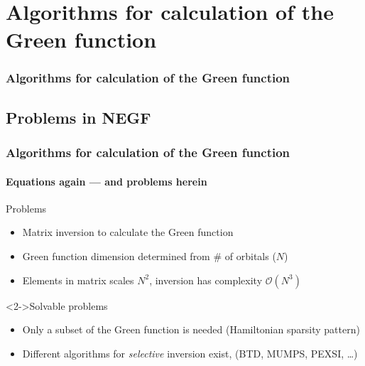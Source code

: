 \section{Algorithms for calculation of the Green function}

\begin{framenologo}
  \frametitle{Algorithms for calculation of the Green function}
  \tableofcontents[currentsection]
\end{framenologo}


\subsection{Problems in NEGF}

\begin{framenologo}
  \frametitle{Algorithms for calculation of the Green function}
  \framesubtitle{Equations again --- and problems herein}


  \begin{block}{Problems}
    \begin{itemize}
      \item Matrix inversion to calculate the Green function
      \item Green function dimension determined from \# of orbitals ($N$)
      \item Elements in matrix scales $N^2$, inversion has complexity $\mathcal O(N^3)$
    \end{itemize}
  \end{block}

  \begin{block}<2->{Solvable problems}
    \begin{itemize}
      \item Only a subset of the Green function is needed (Hamiltonian sparsity pattern)
      \item Different algorithms for \emph{selective} inversion exist, (BTD, MUMPS,
      PEXSI, \dots)
    \end{itemize}
  \end{block}

\end{framenologo}


